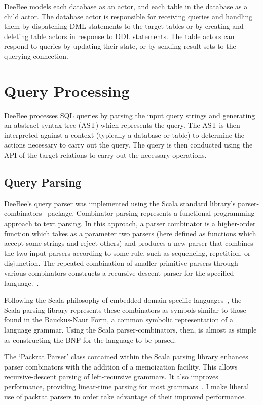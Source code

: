 DeeBee models each database as an actor, and each table in the database as a child actor. The database actor is responsible for receiving queries and handling them by dispatching DML statements to the target tables or by creating and deleting table actors in response to DDL statements. The table actors can respond to queries by updating their state, or by sending result sets to the querying connection.

\section{Query Processing}

DeeBee processes SQL queries by parsing the input query strings and generating an abstract syntax tree (AST) which represents the query. The AST is then interpreted against a context (typically a database or table) to determine the actions necessary to carry out the query. The query is then conducted using the API of the target relations to carry out the necessary operations.

\subsection{Query Parsing}
\label{sec:parsing}

DeeBee's query parser was implemented using the Scala standard library's parser-combinators~\cite{moors2008parser} package. Combinator parsing represents a functional programming approach to text parsing. In this approach, a parser combinator is a higher-order function which takes as a parameter two parsers (here defined as functions which accept some strings and reject others) and produces a new parser that combines the two input parsers according to some rule, such as sequencing, repetition, or disjunction. The repeated combination of smaller primitive parsers through various combinators constructs a recursive-descent parser for the specified language.~\cite{moors2008parser,swierstra2001combinator,fokker1995functional,frost2008parser}.

Following the Scala philosophy of embedded domain-specific languages~\cite{ghosh2010dsls,hofer2008polymorphic,moors2008parser}, the Scala parsing library represents these combinators as symbols similar to those found in the Bauckus-Naur Form, a common symbolic representation of a language grammar. Using the Scala parser-combinators, then, is almost as simple as constructing the BNF for the language to be parsed.

The `Packrat Parser' class contained within the Scala parsing library enhances parser combinators with the addition of a memoization facility. This allows recursive-descent parsing of left-recursive grammars. It also improves performance, providing linear-time parsing for most grammars~\cite{jonnalagedda2009packrat}. I make liberal use of packrat parsers in order take advantage of their improved performance.

